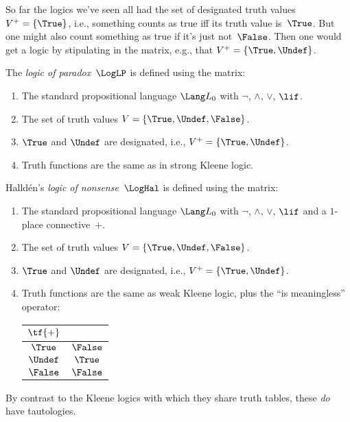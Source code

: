 \documentclass[../../../include/open-logic-section]{subfiles}
\begin{document}

So far the logics we've seen all had the set of designated truth
values $V^+ = \{\True\}$, i.e., something counts as true iff its truth
value is~$\True$.  But one might also count something as true if it's
just not~$\False$. Then one would get a logic by stipulating in the
matrix, e.g., that $V^+ = \{\True, \Undef\}$.

\begin{defn}
The \emph{logic of paradox}~$\LogLP$ is defined using the matrix:
\begin{enumerate}
  \item The standard propositional language $\Lang L_0$ with
  $\lnot$, $\land$, $\lor$, $\lif$.
  \item The set of truth values $V = \{\True, \Undef, \False\}$.
  \item $\True$ and $\Undef$ are designated, i.e., $V^+ = \{\True, \Undef\}$.
  \item Truth functions are the same as in strong Kleene logic.
\end{enumerate}
\end{defn}

\begin{defn}
Halld\'en's \emph{logic of nonsense}~$\LogHal$ is defined using the matrix:
\begin{enumerate}
  \item The standard propositional language $\Lang L_0$ with
  $\lnot$, $\land$, $\lor$, $\lif$ and a $1$-place connective~$+$.
  \item The set of truth values $V = \{\True, \Undef, \False\}$.
  \item $\True$ and $\Undef$ are designated, i.e., $V^+ = \{\True, \Undef\}$.
  \item Truth functions are the same as weak Kleene logic, plus the
  ``is meaningless'' operator:
  \begin{center}
    \begin{tabular}{c|c} 
    $\tf{+}$ & \\ 
    \hline  
    $\True$ & $\False$ \\ 
    $\Undef$ & $\True$ \\
    $\False$ & $\False$ 
    \end{tabular}
  \end{center}
\end{enumerate}
\end{defn}

By contrast to the Kleene logics with which they share truth tables,
these \emph{do} have tautologies. 
\end{document}
